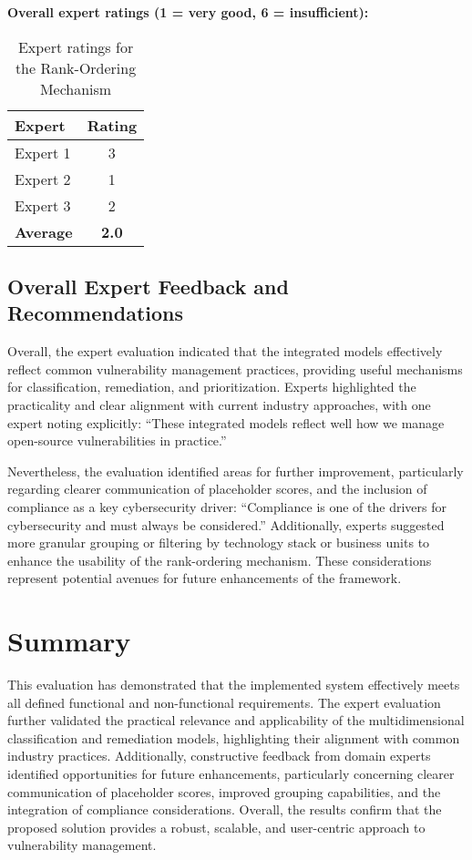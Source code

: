 \textbf{Overall expert ratings (1 = very good, 6 = insufficient):}
\\
\begin{table}[H]
\centering
\begin{tabular}{|l|c|}
    \hline
    Expert & Rating \\
    \hline
    Expert 1 & 3 \\
    Expert 2 & 1 \\
    Expert 3 & 2 \\
    \hline
    \textbf{Average} & \textbf{2.0} \\
    \hline
\end{tabular}
\caption{Expert ratings for the Rank-Ordering Mechanism}
\label{tab:expert_ratings_rank_ordering}
\end{table}

\subsection{Overall Expert Feedback and Recommendations}
\label{subsec:overall_expert_feedback_recommendations}

Overall, the expert evaluation indicated that the integrated models effectively reflect common vulnerability management practices, providing useful mechanisms for classification, remediation, and prioritization. Experts highlighted the practicality and clear alignment with current industry approaches, with one expert noting explicitly: \enquote{These integrated models reflect well how we manage open-source vulnerabilities in practice.}

Nevertheless, the evaluation identified areas for further improvement, particularly regarding clearer communication of placeholder scores, and the inclusion of compliance as a key cybersecurity driver: \enquote{Compliance is one of the drivers for cybersecurity and must always be considered.} Additionally, experts suggested more granular grouping or filtering by technology stack or business units to enhance the usability of the rank-ordering mechanism. These considerations represent potential avenues for future enhancements of the framework.

\section{Summary}

This evaluation has demonstrated that the implemented system effectively meets all defined functional and non-functional requirements. The expert evaluation further validated the practical relevance and applicability of the multidimensional classification and remediation models, highlighting their alignment with common industry practices. Additionally, constructive feedback from domain experts identified opportunities for future enhancements, particularly concerning clearer communication of placeholder scores, improved grouping capabilities, and the integration of compliance considerations. Overall, the results confirm that the proposed solution provides a robust, scalable, and user-centric approach to vulnerability management.